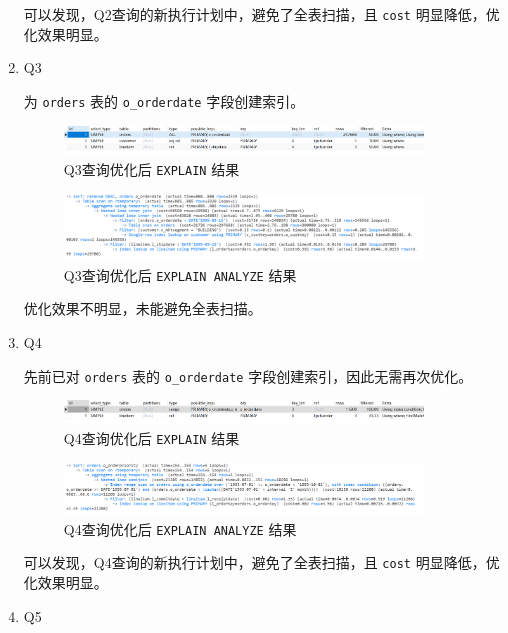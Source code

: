 \documentclass{article}
\renewcommand\tt{\texttt}
\begin{document}
\begin{enumerate}
可以发现，Q2查询的新执行计划中，避免了全表扫描，且 \tt{cost} 明显降低，优化效果明显。

  \item Q3
  
为 \tt{orders} 表的 \tt{o\_orderdate} 字段创建索引。

\begin{figure}[H]
\centering
\includegraphics[width=0.9\textwidth]{img/49.png}
\caption{Q3查询优化后 \tt{EXPLAIN} 结果}
\end{figure}

\begin{figure}[H]
\centering
\includegraphics[width=0.9\textwidth]{img/50.png}
\caption{Q3查询优化后 \tt{EXPLAIN ANALYZE} 结果}
\end{figure}

优化效果不明显，未能避免全表扫描。

  \item Q4
  
先前已对 \tt{orders} 表的 \tt{o\_orderdate} 字段创建索引，因此无需再次优化。

\begin{figure}[H]
\centering
\includegraphics[width=0.9\textwidth]{img/51.png}
\caption{Q4查询优化后 \tt{EXPLAIN} 结果}
\end{figure}

\begin{figure}[H]
\centering
\includegraphics[width=0.9\textwidth]{img/52.png}
\caption{Q4查询优化后 \tt{EXPLAIN ANALYZE} 结果}
\end{figure}

可以发现，Q4查询的新执行计划中，避免了全表扫描，且 \tt{cost} 明显降低，优化效果明显。

  \item Q5
  

\end{enumerate}
\end{document}
